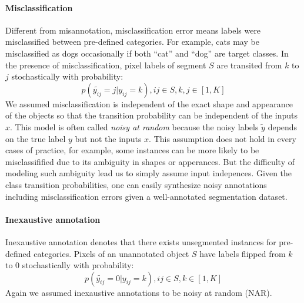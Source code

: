 \noindent
\paragraph{Misclassification}
Different from misannotation, misclassification error means labels were misclassified between pre-defined categories.
For example, cats may be misclassified as dogs occasionally if both ``cat'' and ``dog'' are target classes.
In the presence of misclassification, pixel labels of segment $S$ are transited from $k$ to $j$ stochastically with probability:
$$p(\tilde{y_{ij}}=j \vert y_{ij}=k), ij \in S, k,j \in [1,K]$$
We assumed misclassification is independent of the exact shape and appearance of the objects so that the transition probability can be independent of the inputs $x$.
This model is often called \textit{noisy at random} \cite{frenay2014classification} because the noisy labels $\tilde{y}$ depends on the true label $y$ but not the inputs $x$.
This assumption does not hold in every cases of practice, for example, some instances can be more likely to be misclassifified due to its ambiguity in shapes or apperances.
But the difficulty of modeling such ambiguity lead us to simply assume input indepences.
Given the class transition probabilities, one can easily synthesize noisy annotations including misclassification errors given a well-annotated segmentation dataset.

\noindent
\paragraph{Inexaustive annotation}
Inexaustive annotation denotes that there exists unsegmented instances for pre-defined categories.
Pixels of an unannotated object $S$ have labels flipped from $k$ to $0$ stochastically with probability:
$$p(\tilde{y_{ij}}=0\vert y_{ij}=k), ij \in S, k \in [1,K]$$
Again we assumed inexaustive annotations to be noisy at random (NAR).




